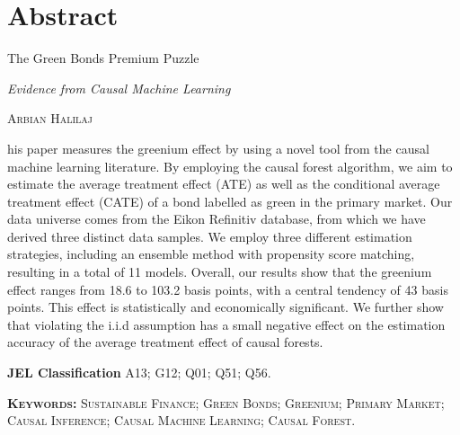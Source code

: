 %
%

\chapter*{Abstract}

\begin{center}
    {\HUGE \color{citecolour} The Green Bonds Premium Puzzle \par}
    \vspace{2.5mm}
    {\Large \textit{Evidence from Causal Machine Learning}}
    \vspace{6.5mm}
    
    {\centering\large\textsc{Arbian Halilaj}}
    \vspace{6.5mm}
\end{center}


his paper measures the greenium effect by using a novel tool from the causal machine learning literature. By employing the causal forest algorithm, we aim to estimate the average treatment effect (ATE) as well as the conditional average treatment effect (CATE) of a bond labelled as green in the primary market. Our data universe comes from the Eikon Refinitiv database, from which we have derived three distinct data samples. We employ three different estimation strategies, including an ensemble method with propensity score matching, resulting in a total of 11 models. Overall, our results show that the greenium effect ranges from 18.6 to 103.2 basis points, with a central tendency of 43 basis points. This effect is statistically and economically significant. We further show that violating the i.i.d assumption has a small negative effect on the estimation accuracy of the average treatment effect of causal forests.

\vspace{14mm}

{\textbf{JEL Classification}} 
A13; G12; Q01; Q51; Q56.

{\large \textbf{\textsc{Keywords:}}} {\textsc{Sustainable Finance; Green Bonds; Greenium; Primary Market; Causal Inference; Causal Machine Learning; Causal Forest.}}


\clearpage